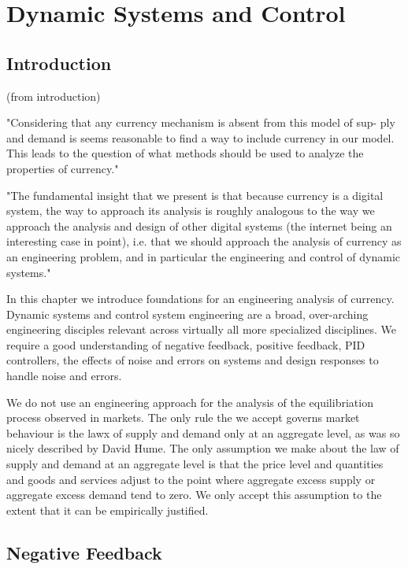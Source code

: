 \chapter{Dynamic Systems and Control}

\section{Introduction}

(from introduction)

"Considering that any currency mechanism is absent from this model of sup-
ply and demand is seems reasonable to find a way to include currency in our
model. This leads to the question of what methods should be used to analyze
the properties of currency."

"The fundamental insight that we present is that because currency is a digital
system, the way to approach its analysis is roughly analogous to the way we
approach the analysis and design of other digital systems (the internet being an
interesting case in point), i.e. that we should approach the analysis of currency
as an engineering problem, and in particular the engineering and control of
dynamic systems."

In this chapter we introduce foundations for an engineering analysis of currency. Dynamic systems
and control system engineering are a broad, over-arching engineering disciples relevant across
virtually all more specialized disciplines. We require a good understanding of negative feedback,
positive feedback, PID controllers, the effects of noise and errors on systems and design responses
to handle noise and errors.

We do not use an engineering approach for the analysis of the equilibriation process observed in
markets. The only rule the we accept governs market behaviour is the lawx of supply and demand only
at an aggregate level, as was so nicely described by David Hume. The only assumption we make about
the law of supply and demand at an aggregate level is that the price level and quantities and goods
and services adjust to the point where aggregate excess supply or aggregate excess demand tend to
zero. We only accept this assumption to the extent that it can be empirically justified.

\section{Negative Feedback}

